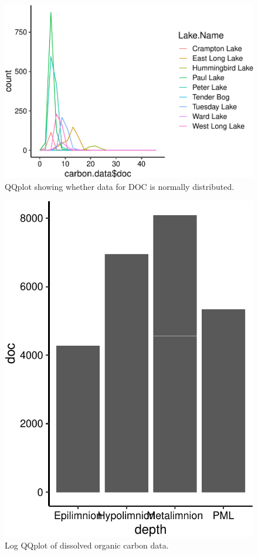\documentclass[12pt,]{article}
\begin{document}
\begin{figure}
\centering
\includegraphics{Watson_ENV872_Project_files/figure-latex/unnamed-chunk-5-1.pdf}
\caption{\label{fig:fig1}QQplot showing whether data for DOC is normally
distributed.}
\end{figure}

\begin{figure}
\centering
\includegraphics{Watson_ENV872_Project_files/figure-latex/unnamed-chunk-6-1.pdf}
\caption{\label{fig:fig2}Log QQplot of dissolved organic carbon data.}
\end{figure}
\end{document}
